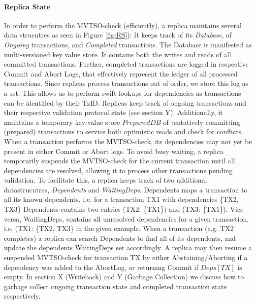 \paragraph{Replica State}
In order to perform the MVTSO-check (efficiently), a replica maintains several data strucutres as seen in Figure \ref{fig:RS}): It keeps track of its \textit{Database}, of \textit{Ongoing} transactions, and \textit{Completed} transactions. The Database is manifested as multi-versioned key value store. It contains both the writes and reads of all committed transactions.
Further, completed transactions are logged in respective Commit and Abort Logs, that effectively represent the ledger of all processed transactions. Since replicas process transactions out of order, we store this log as a set. This allows us to perform swift lookups for dependencies as transactions can be identified by their TxID. 
Replicas keep track of ongoing transactions and their respective validation protocol state (see section Y). Additionally, it maintains a temporary key-value store $PreparedDB$ of tentatively committing (prepared) transactions to service both optimistic reads and check for conflicts. 
When a transaction performs the MVTSO-check, its dependencies may not yet be present in either Commit or Abort logs. To avoid busy waiting, a replica temporarily suspends the MVTSO-check for the current transaction until all dependencies are resolved, allowing it to process other transactions pending validation. To facilitate this, a replica keeps track of two additional datastrucutres, \textit{Dependents} and \textit{WaitingDeps}. Dependents maps a transaction to all its known dependents, i.e. for a transaction TX1 with dependencies \{TX2, TX3\} Dependents contains two entries (TX2: \{TX1\}) and (TX3: \{TX1\}). Vice versa, WaitingDeps, contains all unresolved dependencies for a given transaction, i.e. (TX1: \{TX2, TX3\} in the given example. When a transaction (e.g. TX2 completes) a replica can search Dependents to find all of its dependents, and update the dependents WaitingDeps set accordingly. A replica may then resume a suspended MVTSO-check for transaction TX by either Abstaining/Aborting if a dependency was added to the AbortLog, or returning Commit if $Deps[TX]$ is empty.
In section X (Writeback) and Y (Garbage Collection) we discuss how to garbage collect ongoing transaction state and completed transaction state respectively. 




